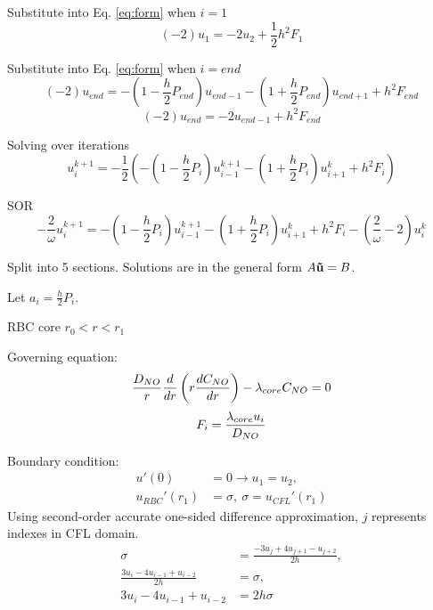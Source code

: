 \documentclass[8pt, a4paper]{article}
\begin{document}
  Substitute into Eq. \eqref{eq:form} when $i=1$
  \begin{equation}
  (-2)u_1=-2u_2+\frac{1}{2}h^2F_1
  \end{equation}
  
  Substitute into Eq. \eqref{eq:form} when $i=end$
  \begin{equation}
  (-2)u_{end}=-\left (1-\frac{h}{2}P_{end} \right)u_{end-1}-\left 
  (1+\frac{h}{2}P_{end} \right)u_{end+1}+h^2F_{end}
  \end{equation}
  \begin{equation}
  (-2)u_{end}=-2u_{end-1}+h^2F_{end}
  \end{equation}
  
  Solving over iterations
  \begin{equation}
  u_i^{k+1} = -\frac{1}{2}\left(-\left (1-\frac{h}{2}P_i 
  \right)u_{i-1}^{k+1}-\left (1+\frac{h}{2}P_i \right)u_{i+1}^k+h^2F_i \right)
  \end{equation}
  
  SOR
  \begin{equation}
  -\frac{2}{\omega}u_i^{k+1} = -\left (1-\frac{h}{2}P_i  
  \right)u_{i-1}^{k+1}-\left (1+\frac{h}{2}P_i \right)u_{i+1}^k+h^2F_i - 
  \left(\frac{2}{\omega}-2 \right)u_i^k
  \end{equation}

  Split into 5 sections. Solutions are in the general form $A\mathbf{\vec{u}}=B$.
  
  Let  $a_i=\frac{h}{2}P_i$.

  RBC core $r_0 < r < r_1$
  
  Governing equation:
  \begin{equation*}
  \frac{D_{NO}}{r}\frac{d}{dr}\left(r\frac{dC_{NO}}{dr}\right)-\lambda_{core}C_{NO}=0
  \end{equation*}
  \begin{equation*}
  F_i = \frac{\lambda_{core}u_i}{D_{NO}}
  \end{equation*}
  
  Boundary condition:
  \begin{align*}
  u'(0)&=0\rightarrow u_1 = u_2,\\
  u_{RBC}'(r_1)&=\sigma,\:\sigma=u_{CFL}'(r_1)
  \end{align*}
  Using second-order accurate one-sided difference approximation, $j$ 
  represents indexes in CFL domain.
  \begin{align*}
  \sigma&=\frac{-3u_j+4u_{j+1}-u_{j+2}}{2h},\\
  \frac{3u_i-4u_{i-1}+u_{i-2}}{2h}&=\sigma,\\
  3u_i-4u_{i-1}+u_{i-2}&=2h\sigma
  \end{align*}
  
\end{document}

